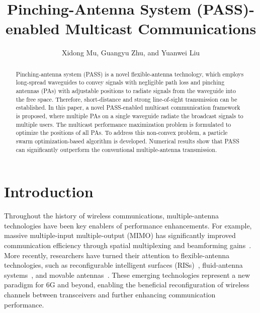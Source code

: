 \documentclass[summary]{ursi}
\title{Pinching-Antenna System (PASS)-enabled Multicast Communications}
\author{Xidong Mu\affref{ref1}, Guangyu Zhu\affref{ref2},
  and Yuanwei Liu\affref{ref3}}
\affiliation{%
  \aff{ref1}{Centre for Wireless Innovation, Queen's University Belfast, Belfast, BT3 9DT, U.K.}
  \aff{ref2}{School of Artificial Intelligence, Beijing University of Posts and Telecommunications, Beijing, 100876, China.}
  \aff{ref3}{Department of Electrical and Electronic Engineering, The University of Hong Kong, Hong Kong.}
}
\begin{document}
\maketitle

\begin{abstract}
Pinching-antenna system (PASS) is a novel flexible-antenna technology, which employs long-spread waveguides to convey signals with negligible path loss and pinching antennas (PAs) with adjustable positions to radiate signals from the waveguide into the free space. Therefore, short-distance and strong line-of-sight transmission can be established. In this paper, a novel PASS-enabled multicast communication framework is proposed, where multiple PAs on a single waveguide radiate the broadcast signals to multiple users. The multicast performance maximization problem is formulated to optimize the positions of all PAs. To address this non-convex problem, a particle swarm optimization-based algorithm is developed. Numerical results show that PASS can significantly outperform the conventional multiple-antenna transmission.
\end{abstract}

\section{Introduction}
Throughout the history of wireless communications, multiple-antenna technologies have been key enablers of performance enhancements. For example, massive multiple-input multiple-output (MIMO) has significantly improved communication efficiency through spatial multiplexing and beamforming gains~\cite{6736761}. More recently, researchers have turned their attention to flexible-antenna technologies, such as reconfigurable intelligent surfaces (RISs)~\cite{9140329}, fluid-antenna systems~\cite{9264694}, and movable antennas~\cite{10286328}. These emerging technologies represent a new paradigm for 6G and beyond, enabling the beneficial reconfiguration of wireless channels between transceivers and further enhancing communication performance. 
\end{document}
